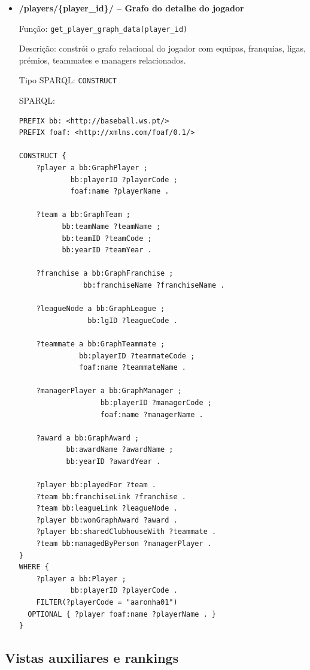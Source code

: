\begin{itemize}[leftmargin=*]
  \item \textbf{/players/\{player\_id\}/ -- Grafo do detalhe do jogador}
  
  Fun\c{c}\~ao: \texttt{get\_player\_graph\_data(player\_id)}
  
  Descri\c{c}\~ao: constr\'oi o grafo relacional do jogador com equipas, franquias, ligas, pr\'emios, teammates e managers relacionados.
  
  Tipo SPARQL: \texttt{CONSTRUCT}

  SPARQL:

\begin{Verbatim}[fontsize=\scriptsize,breaklines=true]
PREFIX bb: <http://baseball.ws.pt/>
PREFIX foaf: <http://xmlns.com/foaf/0.1/>

CONSTRUCT {
    ?player a bb:GraphPlayer ;
            bb:playerID ?playerCode ;
            foaf:name ?playerName .

    ?team a bb:GraphTeam ;
          bb:teamName ?teamName ;
          bb:teamID ?teamCode ;
          bb:yearID ?teamYear .

    ?franchise a bb:GraphFranchise ;
               bb:franchiseName ?franchiseName .

    ?leagueNode a bb:GraphLeague ;
                bb:lgID ?leagueCode .

    ?teammate a bb:GraphTeammate ;
              bb:playerID ?teammateCode ;
              foaf:name ?teammateName .

    ?managerPlayer a bb:GraphManager ;
                   bb:playerID ?managerCode ;
                   foaf:name ?managerName .

    ?award a bb:GraphAward ;
           bb:awardName ?awardName ;
           bb:yearID ?awardYear .

    ?player bb:playedFor ?team .
    ?team bb:franchiseLink ?franchise .
    ?team bb:leagueLink ?leagueNode .
    ?player bb:wonGraphAward ?award .
    ?player bb:sharedClubhouseWith ?teammate .
    ?team bb:managedByPerson ?managerPlayer .
}
WHERE {
    ?player a bb:Player ;
            bb:playerID ?playerCode .
    FILTER(?playerCode = "aaronha01")
  OPTIONAL { ?player foaf:name ?playerName . }
}
\end{Verbatim}
\end{itemize}

\subsection{Vistas auxiliares e rankings}


